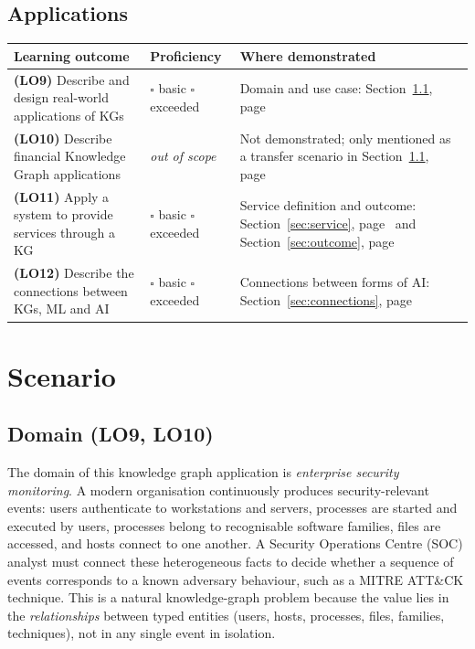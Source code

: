 \documentclass{article}
\newcommand{\lopage}[1]{Section~\ref{#1}, page~\pageref{#1}}
\begin{document}
\subsection*{Applications}
\begin{table}[h]
\centering
\begin{tabular}{p{5.2cm}p{2.6cm}p{5.4cm}}
\toprule
\textbf{Learning outcome} & \textbf{Proficiency} & \textbf{Where demonstrated} \\
\midrule
\textbf{(LO9)} Describe and design real-world applications of KGs &
$\square$ basic \newline $\square$ exceeded &
Domain and use case: \lopage{sec:domain} \\
\addlinespace
\textbf{(LO10)} Describe financial Knowledge Graph applications &
\textit{out of scope} &
Not demonstrated; only mentioned as a transfer scenario in \lopage{sec:domain} \\
\addlinespace
\textbf{(LO11)} Apply a system to provide services through a KG &
$\square$ basic \newline $\square$ exceeded &
Service definition and outcome: \lopage{sec:service} and \lopage{sec:outcome} \\
\addlinespace
\textbf{(LO12)} Describe the connections between KGs, ML and AI &
$\square$ basic \newline $\square$ exceeded &
Connections between forms of AI: \lopage{sec:connections} \\
\bottomrule
\end{tabular}
\end{table}

\clearpage

\section{Scenario}

\subsection{Domain (LO9, LO10)}
\label{sec:domain}
The domain of this knowledge graph application is \emph{enterprise security
monitoring}. A modern organisation continuously produces security-relevant
events: users authenticate to workstations and servers, processes are started
and executed by users, processes belong to recognisable software families,
files are accessed, and hosts connect to one another. A Security Operations
Centre (SOC) analyst must connect these heterogeneous facts to decide whether
a sequence of events corresponds to a known adversary behaviour, such as a
MITRE ATT\&CK technique. This is a natural knowledge-graph problem because the
value lies in the \emph{relationships} between typed entities (users, hosts,
processes, files, families, techniques), not in any single event in isolation.
\end{document}

